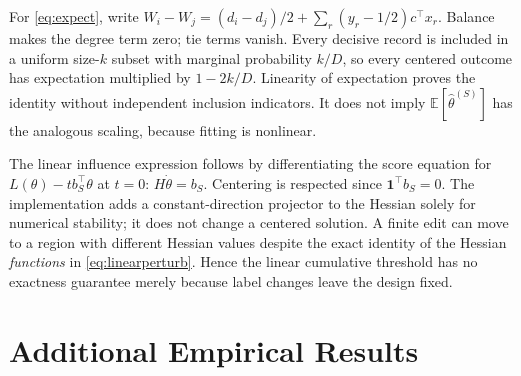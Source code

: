 \documentclass{article}
\newcommand{\ind}{\mathbf 1}
\begin{document}
For \cref{eq:expect}, write $W_i-W_j=(d_i-d_j)/2+\sum_r(y_r-1/2)c^\top x_r$. Balance makes the degree term zero; tie terms vanish. Every decisive record is included in a uniform size-$k$ subset with marginal probability $k/D$, so every centered outcome has expectation multiplied by $1-2k/D$. Linearity of expectation proves the identity without independent inclusion indicators. It does not imply $\mathbb E[\hat\theta^{(S)}]$ has the analogous scaling, because fitting is nonlinear.

The linear influence expression follows by differentiating the score equation for $L(\theta)-t b_S^\top\theta$ at $t=0$: $H\dot\theta=b_S$. Centering is respected since $\ind^\top b_S=0$. The implementation adds a constant-direction projector to the Hessian solely for numerical stability; it does not change a centered solution. A finite edit can move to a region with different Hessian values despite the exact identity of the Hessian \emph{functions} in \cref{eq:linearperturb}. Hence the linear cumulative threshold has no exactness guarantee merely because label changes leave the design fixed.

\section{Additional Empirical Results}\label{app:more}
\begin{table}[!ht]
\caption{Primary top-pair baseline budgets from full refits. Dashes mean the direct baseline exhausted available helpful outcomes without crossing; they are not missing experiments. All selected main witnesses involve at least one focal endpoint. The win-gain rule is scored in win units and has no reported logit-linear prediction.}
\label{tab:baselines}\centering
\end{table}

\begin{table}[!ht]
\caption{Balanced matched-panel summaries. Panel intervals are 2.5th--97.5th percentiles of 500 panel outcomes, not confidence intervals for a population effect. The human original leader is GPT-4 in every panel, while the runner-up is Claude-v1 in 472 panels and GPT-3.5-turbo in 28. The human leader radius differs from the fixed GPT-4/Claude radius in 24 panels.}
\label{tab:matched}\centering\small
\end{table}

\begin{table}[!ht]
\caption{Approximation error among crossed broader pair audits, comparing the linear predicted threshold with the first fully refitted crossing along the same ordered prefix. Relative error divides absolute count error by the refitted count. Top-pair results are included; each distinct pair occurs once. Uncrossed cases are excluded from error summaries and included in tested denominators.}
\label{tab:approx}\centering
\end{table}
\end{document}
